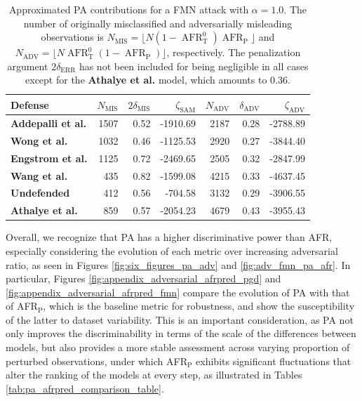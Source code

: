 \begin{table}[b]
    \centering
    \begin{tabular}{l|rrr|rrr}
    Defense & $N_{\text{MIS}}$ & $2 \delta_{\text{MIS}}$ & $\zeta_{\text{SAM}}$ & $N_{\text{ADV}}$ & $\delta_{\text{ADV}}$ & $\zeta_{\text{ADV}}$ \\
    \midrule
    {\color{tab:purple} \textbf{Addepalli et al.}} & 1507 & 0.52 & -1910.69 & 2187 & 0.28 & -2788.89 \\
    {\color{tab:red} \textbf{Wong et al.}} & 1032 & 0.46 & -1125.53 & 2920 & 0.27 & -3844.40 \\
    {\color{tab:blue} \textbf{Engstrom et al.}} & 1125 & 0.72 & -2469.65 & 2505 & 0.32 & -2847.99 \\
    {\color{tab:brown} \textbf{Wang et al.}} & 435 & 0.82 & -1599.08 & 4215 & 0.33 & -4637.45 \\
    {\color{tab:orange} \textbf{Undefended}} & 412 & 0.56 & -704.58 & 3132 & 0.29 & -3906.55 \\
    {\color{tab:green} \textbf{Athalye et al.}} & 859 & 0.57 & -2054.23 & 4679 & 0.43 & -3955.43 \\
    \bottomrule
    \end{tabular}
    \caption{
    Approximated PA contributions for a FMN attack with $\alpha = 1.0$. The number of 
    originally misclassified and adversarially misleading
    observations is $N_{\text{MIS}} = \lfloor N (1-\operatorname{AFR}_\text{T}^0) \operatorname{AFR}_\text{P} \rfloor$ and
    $N_{\text{ADV}} = \lfloor N \operatorname{AFR}_\text{T}^0 (1-\operatorname{AFR}_\text{P}) \rfloor$, respectively. 
    The penalization argument $2 \delta_{\text{ERR}}$ has not
    been included for being negligible in all cases except for the 
    {\color{tab:green} \textbf{Athalye et al.}} model, which amounts to 0.36. 
    }
    \label{tab:approx_pa_fmn_table}
    \end{table}

Overall, we recognize that PA has a higher discriminative power than AFR, especially
considering the evolution of each metric over increasing adversarial ratio, as
seen in Figures \ref{fig:six_figures_pa_adv} and \ref{fig:adv_fmn_pa_afr}. 
In particular, Figures \ref{fig:appendix_adversarial_afrpred_pgd} and \ref{fig:appendix_adversarial_afrpred_fmn}
compare the evolution of PA with that of AFR$_\text{P}$, which is the baseline metric for robustness,
and show the susceptibility of the latter to dataset variability. This is an important
consideration, as PA not only improves the discriminability in terms of the scale of
the differences between models, but also provides a more stable assessment across varying
proportion of perturbed observations, under which AFR$_\text{P}$ exhibits significant fluctuations
that alter the ranking of the models at every step, as illustrated in 
Tables \ref{tab:pa_afrpred_comparison_table}. \\

